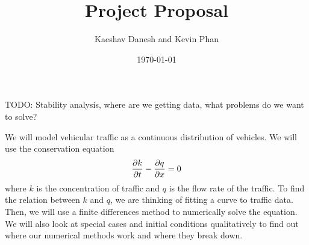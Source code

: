\documentclass[12pt]{article}
\title{Project Proposal}
\author{Kaeshav Danesh and Kevin Phan}
\date{\today}
\begin{document}
	
	\maketitle
    TODO: Stability analysis, where are we getting data, what problems do we want to solve?

    We will model vehicular traffic as a continuous distribution of vehicles. We will use the conservation equation 
    \begin{equation}
        \pdv{k}{t} - \pdv{q}{x} = 0
    \end{equation}
    where $k$ is the concentration of traffic and $q$ is the flow rate of the traffic. To find the relation between $k$ and $q$, we are thinking of fitting a curve to traffic data. Then, we will use a finite differences method to numerically solve the equation. We will also look at special cases and initial conditions qualitatively to find out where our numerical methods work and where they break down. 
\end{document}
